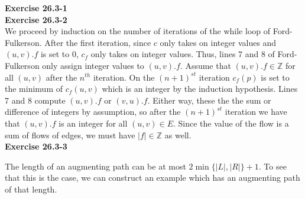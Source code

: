 \documentclass{article}
\begin{document}
\noindent\textbf{Exercise 26.3-1}\\

\noindent\textbf{Exercise 26.3-2}\\

We proceed by induction on the number of iterations of the while loop of Ford-Fulkerson.  After the first iteration, since $c$ only takes on integer values and $(u,v).f$ is set to 0, $c_f$ only takes on integer values.  Thus, lines 7 and 8 of Ford-Fulkerson only assign integer values to $(u,v).f$.  Assume that $(u,v).f \in \mathbb{Z}$ for all $(u,v)$ after the $n^{th}$ iteration.  On the $(n+1)^{st}$ iteration $c_f(p)$ is set to the minimum of $c_f(u,v)$ which is an integer by the induction hypothesis.  Lines 7 and 8 compute $(u,v).f$ or $(v,u).f$.  Either way, these the the sum or difference of integers by assumption, so after the $(n+1)^{st}$ iteration we have that $(u,v).f$ is an integer for all $(u,v) \in E$.  Since the value of the flow is a sum of flows of edges, we must have $|f| \in \mathbb{Z}$ as well.  \\

\noindent\textbf{Exercise 26.3-3}\\

\begin{comment}
We will try to show that any augmenting path that is found by Ford-Fulkerson must have length at most 5. To do this, we'll show the stronger fact that any augmenting path that is found will be of length 3 or 5. It is clear that the augmenting path cannot be of length less than 3 because we can separate the vertices of the flow network into four parts, $\{\{s\},L,R,\{t\}\}$ where all the edges only appear between $s$ and $L$, between $L$ and $R$, and between $R$ and $\{t\}$. This fact also gets us that there are no even length paths, so four is out.  Then, we will be done if we can show that no augmenting path that is found has length greater than $5$. To do this, we rely on the fact that since Bellman-Ford finds augmenting paths of shorter length first because it uses BFS to find augmenting paths. This means that to show that no augmenting path of length greater than $5$ will be found, we will show that if there is any augmenting path, then there must be one that is of length $5$ or less. Suppose that we have some augmenting path of length greater than $5$. 
\end{comment}

The length of an augmenting path can be at most $2\min\{|L|,|R|\}+1$. To see that this is the case, we can construct an example which has an augmenting path of that length.
\end{document}
